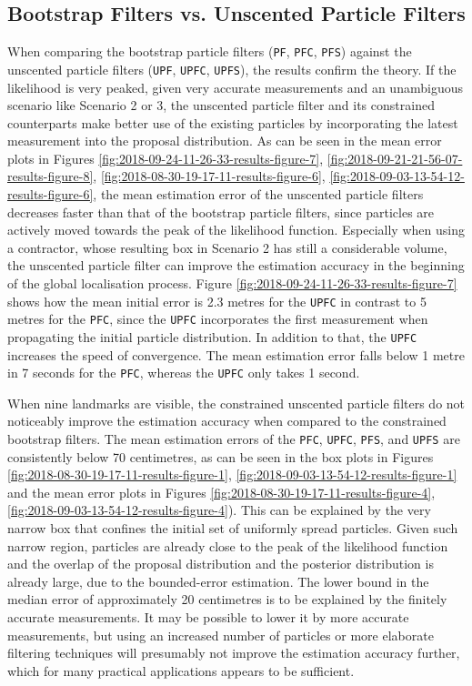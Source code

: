 \subsection[Bootstrap vs. Unscented Particle Filters]{Bootstrap Filters vs. Unscented Particle Filters}\label{sec:unscentedvspf}

When comparing the bootstrap particle filters (\texttt{PF}, \texttt{PFC}, \texttt{PFS}) against the unscented
particle filters (\texttt{UPF}, \texttt{UPFC}, \texttt{UPFS}), the results confirm the theory. If the likelihood is very peaked, given very accurate measurements and an unambiguous scenario like Scenario 2 or 3, the unscented particle filter and its constrained counterparts make better use of the existing particles by incorporating the latest measurement into the proposal distribution. As can be seen in the mean error plots in Figures \ref{fig:2018-09-24-11-26-33-results-figure-7}, \ref{fig:2018-09-21-21-56-07-results-figure-8}, \ref{fig:2018-08-30-19-17-11-results-figure-6}, \ref{fig:2018-09-03-13-54-12-results-figure-6}, the mean estimation error of the unscented particle filters decreases faster than that of the bootstrap particle filters, since particles are actively moved towards the peak of the likelihood function. Especially when using a contractor, whose resulting box in Scenario 2 has still a considerable volume, the unscented particle filter can improve the estimation accuracy in the beginning of the global localisation process. Figure \ref{fig:2018-09-24-11-26-33-results-figure-7} shows how the mean initial error is 2.3 metres for the \texttt{UPFC} in contrast to 5 metres for the \texttt{PFC}, since the \texttt{UPFC} incorporates the first measurement when propagating the initial particle distribution. In addition to that, the \texttt{UPFC} increases the speed of convergence. The mean estimation error falls below 1 metre in 7 seconds for the \texttt{PFC}, whereas the \texttt{UPFC} only takes 1 second.

When nine landmarks are visible, the constrained unscented particle filters do not noticeably improve the estimation accuracy when compared to the constrained bootstrap filters. The mean estimation errors of the \texttt{PFC}, \texttt{UPFC}, \texttt{PFS}, and \texttt{UPFS} are consistently below 70 centimetres, as can be seen in the box plots in Figures \ref{fig:2018-08-30-19-17-11-results-figure-1}, \ref{fig:2018-09-03-13-54-12-results-figure-1} and the mean error plots in Figures \ref{fig:2018-08-30-19-17-11-results-figure-4}, \ref{fig:2018-09-03-13-54-12-results-figure-4}). This can be explained by the very narrow box that confines the initial set of uniformly spread particles. Given such narrow region, particles are already close to the peak of the likelihood function and the overlap of the proposal distribution and the posterior distribution is already large, due to the bounded-error estimation. The lower bound in the median error of approximately 20 centimetres is to be explained by the finitely accurate measurements. It may be possible to lower it by more accurate measurements, but using an increased number of particles or more elaborate filtering techniques will presumably not improve the estimation accuracy further, which for many practical applications appears to be sufficient.
  

